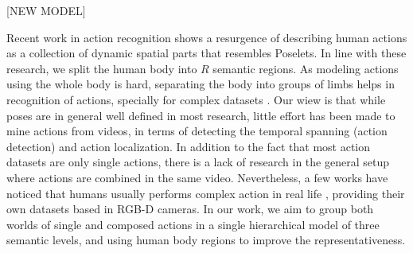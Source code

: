 [NEW MODEL]

Recent work in action recognition \cite{Cheron2015,Tao2015, Wang2011,Jhuang2013} shows a resurgence of describing human actions as a collection of dynamic spatial parts that resembles Poselets. In line with these research, we split the human body into $R$ semantic regions. As modeling actions using the whole body is hard, separating the body into groups of limbs helps in recognition of actions, specially for complex datasets \cite{Tao2015}. Our wiew is that while poses are in general well defined in most research, little effort has been made to mine actions from videos, in terms of detecting the temporal spanning (action detection) and action localization. In addition to the fact that most action datasets are only single actions, there is a lack of research in the general setup where actions are combined in the same video. Nevertheless, a few works have noticed that humans usually performs complex action in real life \cite{Wei2013, Lillo2014}, providing their own datasets based in RGB-D cameras. In our work, we aim to group both worlds of single and composed actions in a single hierarchical model of three semantic levels, and using human body regions to improve the representativeness. 

